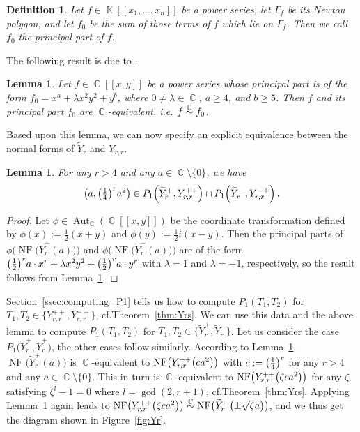 \documentclass{amsproc}
\newtheorem{defn}[theorem]{Definition}
\newtheorem{lemma}[theorem]{Lemma}
\theoremstyle{definition}
\let\originalleft\left
\let\originalright\right
\renewcommand{\left}{\mathopen{}\mathclose\bgroup\originalleft}
\renewcommand{\right}{\aftergroup\egroup\originalright}
\newcommand{\tY}{\widetilde{Y}}
\DeclareMathOperator{\C}{\mathbb{C}}
\DeclareMathOperator{\K}{\mathbb{K}}
\DeclareMathOperator{\NF}{NF}
\DeclareMathOperator{\Aut}{Aut}
\newcommand{\csim}{\ensuremath{\mathrel{%
  \raisebox{0pt}[\heightof{$\overset{\scriptscriptstyle\C}{\sim}$}]{%
    $\overset{\C}{\sim}$%
  }%
}}}
\begin{document}
\begin{defn}
Let $f \in \K[[x_1,\ldots,x_n]]$ be a power series, let $\Gamma_f$ be its
Newton polygon, and let $f_0$ be the sum of those terms of $f$ which lie on
$\Gamma_f$. Then we call $f_0$ the principal part of $f$.
\end{defn}

The following result is due to \citet[Corollary~9.9]{A1974}.

\begin{lemma}\label{lem:principalpart}
Let $f \in \C[[x,y]]$ be a power series whose principal part is of the form
$f_0 = x^a+\lambda x^2y^2+y^b$, where $0 \neq \lambda \in \C$, $a \geq 4$, and
$b \geq 5$. Then $f$ and its principal part $f_0$ are $\C$-equivalent, i.e.\@
$f \csim f_0$.
\end{lemma}

Based upon this lemma, we can now specify an explicit equivalence between the
normal forms of $\tY_r$ and $Y_{r,r}$.

\begin{lemma}\label{lem:Yr_equivalences}
For any $r > 4$ and any $a \in \C \setminus \{0\}$, we have
\[
\left(a, \left(\textstyle\frac{1}{4}\right)^r a^2\right)
\in P_1\left(\tY_r^+, Y_{r,r}^{++}\right)
\cap P_1\left(\tY_r^-, Y_{r,r}^{-+}\right) \,.
\]
\end{lemma}

\begin{proof}
Let $\phi \in \Aut_{\C}(\C[[x,y]])$ be the coordinate transformation defined by
$\phi(x) := \frac{1}{2}(x+y)$ and $\phi(y) := \frac{1}{2}i(x-y)$. Then the
principal parts of $\phi\bigl(\NF\bigl(\tY_r^+(a)\bigr)\bigr)$ and
$\phi\bigl(\NF\bigl(\tY_r^-(a)\bigr)\bigr)$ are of the form
$\left(\frac{1}{2}\right)^r a \cdot x^r + \lambda x^2 y^2
+ \left(\frac{1}{2}\right)^r a \cdot y^r$
with $\lambda = 1$ and $\lambda = -1$, respectively, so the result follows from
Lemma~\ref{lem:principalpart}.
\end{proof}

Section~\ref{ssec:computing_P1} tells us how to compute $P_1(T_1, T_2)$ for
$T_1, T_2 \in \{Y_{r,r}^{++}, Y_{r,r}^{-+}\}$, cf.\@ Theorem~\ref{thm:Yrs}. We
can use this data and the above lemma to compute $P_1(T_1, T_2)$ for
$T_1, T_2 \in \bigl\{\tY_r^+, \tY_r^-\bigr\}$. Let us consider the case
$P_1\bigl(\tY_r^+, \tY_r^+\bigr)$, the other cases follow similarly. According
to Lemma~\ref{lem:Yr_equivalences}, $\NF\bigl(\tY_r^+(a)\bigr)$ is
$\C$-equivalent to $\NF\bigl(Y_{r,r}^{++}\left(ca^2\right)\bigr)$ with
$c := \left(\frac{1}{4}\right)^r$ for any $r > 4$ and any
$a \in \C \setminus \{0\}$. This in turn is $\C$-equivalent to
$\NF\bigl(Y_{r,r}^{++}\left(\zeta ca^2\right)\bigr)$ for any $\zeta$ satisfying
$\zeta^l-1 = 0$ where $l = \gcd(2, r+1)$, cf.\@ Theorem~\ref{thm:Yrs}. Applying
Lemma~\ref{lem:Yr_equivalences} again leads to
$\NF\bigl(Y_{r,r}^{++}\left(\zeta ca^2\right)\bigr)
\csim \NF\bigl(\tY_r^+\left(\pm \sqrt{\zeta}a\right)\bigr)$,
and we thus get the diagram shown in Figure~\ref{fig:Yr}.
\end{document}
